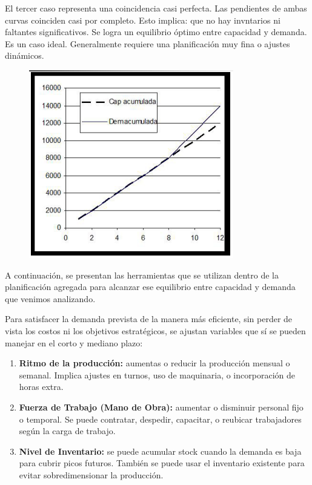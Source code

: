 \documentclass[a4paper,oneside,11pt]{article}
\begin{document}
El tercer caso representa una coincidencia casi perfecta. Las pendientes de ambas curvas coinciden casi por completo. Esto implica: que no hay invntarios ni faltantes significativos. Se logra un equilibrio óptimo entre capacidad y demanda. Es un caso ideal. Generalmente requiere una planificación muy fina o ajustes dinámicos.
\begin{figure} [ht!]
    \centering
    \includegraphics[scale=0.7]{3.png}
\end{figure}

A continuación, se presentan las herramientas que se utilizan dentro de la planificación agregada para alcanzar ese equilibrio entre capacidad y demanda que venimos analizando.

Para satisfacer la demanda prevista de la manera más eficiente, sin perder de vista los costos ni los objetivos estratégicos, se ajustan variables que sí se pueden manejar en el corto y mediano plazo:

\begin{enumerate}
    \item \textbf{Ritmo de la producción:} aumentas o reducir la producción mensual o semanal. Implica ajustes en turnos, uso de maquinaria, o incorporación de horas extra.

    \item \textbf{Fuerza de Trabajo (Mano de Obra):} aumentar o disminuir personal fijo o temporal. Se puede contratar, despedir, capacitar, o reubicar trabajadores según la carga de trabajo.

    \item \textbf{Nivel de Inventario:} se puede acumular stock cuando la demanda es baja para cubrir picos futuros. También se puede usar el inventario existente para evitar sobredimensionar la producción.
\end{enumerate}
\end{document}
